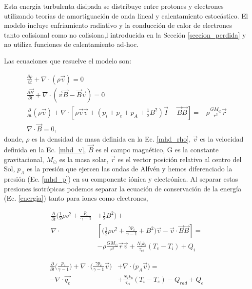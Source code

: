 \documentclass[a4paper,11pt]{report}
\begin{document}
Esta energía turbulenta disipada se distribuye entre protones y electrones utilizando teorías de amortiguación de onda lineal y calentamiento estocástico. El modelo incluye enfriamiento radiativo y la conducción de calor de electrones tanto colisional como no colisiona,l introducida en la Sección \ref{seccion_perdida} y no utiliza funciones de calentamiento ad-hoc.

Las ecuaciones que resuelve el modelo son:

\begin{eqnarray}
\frac{\partial \rho}{\partial t} +\nabla \cdot (\rho \vec{v}) = 0\\ \label{awsom_1}
\frac{\partial \vec{B}}{\partial t} + \nabla \cdot (\vec{v}\vec{B} -\vec{B}\vec{v} ) = 0\\ \label{awsom_2}
\frac{\partial}{\partial t}(\rho \vec{v}) + \nabla \cdot \left[ \rho \vec{v}\vec{v} + (p_i +p_e +p_A+\frac{1}{2}B^2) \vec{I} - \vec{B}\vec{B} \right] = - \rho \frac{GM_{\odot}}{r^3} \vec{r} \label{awsom_3}\\
\nabla \cdot \vec{B} = 0, \label{awsom_4}
\end{eqnarray}
donde, $\rho$ es la densidad de masa definida en la Ec. \ref{mhd_rho}, $\vec{v}$ es la velocidad definida en la Ec.  \ref{mhd_v}, $\vec{B}$ es el campo magnético, G es la constante gravitacional, $M_{\odot}$ es la masa solar, $\vec{r}$ es el vector posición relativo al centro del Sol, $p_A$ es la presión que ejercen las ondas de Alfvén y hemos diferenciado la presión (Ec. \ref{mhd_p}) en su componente iónica y electrónica. Al separar estas presiones isotrópicas podemos separar la ecuación de conservación de la energía (Ec. \ref{energia}) tanto para iones como electrones,  


\begin{equation}
\begin{split} 
 \frac{\partial}{\partial t} \Bigg( \frac{1}{2}\rho v^2 + \frac{p_i}{\gamma -1} &+\frac{1}{2} B^2 \Bigg) + \\
 \nabla \cdot & \left[ \Bigg( \frac{1}{2} \rho v^2 + \frac{ \gamma p_i}{ \gamma -1} + B^2 \Bigg) \vec{v} -\vec{v}\cdot  \vec{B}\vec{B}  \right] =\\
  &-\rho \frac{GM_{\odot}}{r^3}\vec{r}\vec{v}  + \frac{N_i k_b}{\tau_{ei}}(T_e - T_i) + Q_i  \label{awsom_i}
\end{split}
\end{equation}

\begin{equation}
\begin{split} 
 \frac{\partial}{\partial t} \Bigg( \frac{p_e}{\gamma -1} \Bigg) + 
 \nabla \cdot \Bigg( \frac{\gamma p_e}{\gamma -1}\vec{v} \Bigg) &+ \nabla \cdot \Bigg( p_A \vec{v} \Bigg) =\\
  -\nabla \cdot \vec{q_e} &+\frac{N_i k_b}{\tau_{ei}}(T_i - T_e) -Q_{rad} +Q_e  \label{awsom_e}
\end{split}
\end{equation}
\end{document}
